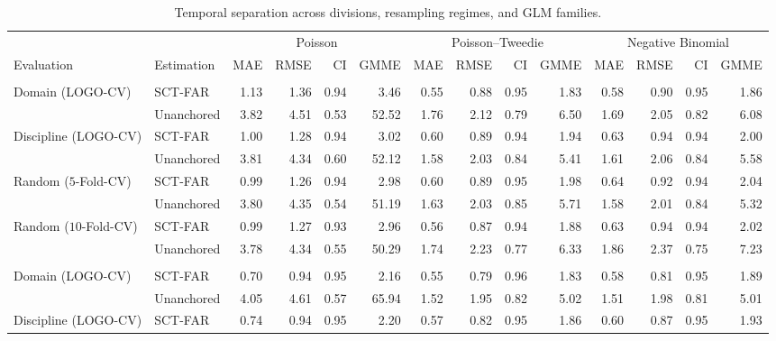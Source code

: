 \documentclass{article}
\begin{document}
\clearpage
\begin{table}[H]
\centering
\scriptsize
\captionsetup{position=top,skip=12pt}
\caption{Temporal separation across divisions, resampling regimes, and GLM families.}
\label{tab:si-temporal}
\setlength{\tabcolsep}{2pt}
\begin{tabularx}{\linewidth}{@{}>{\raggedright\arraybackslash}Xlrrrrrrrrrrrr@{}}
\toprule
 & & \multicolumn{4}{c}{Poisson} & \multicolumn{4}{c}{Poisson--Tweedie} & \multicolumn{4}{c}{Negative Binomial} \\
\cmidrule(lr){3-6}\cmidrule(lr){7-10}\cmidrule(l){11-14}
Evaluation & Estimation & MAE & RMSE & CI & GMME & MAE & RMSE & CI & GMME & MAE & RMSE & CI & GMME \\
\midrule
\multicolumn{14}{@{}l}{\textbf{Prior Window 25\%}} \\
Domain (LOGO-CV) & SCT-FAR & 1.13 & 1.36 & 0.94 & 3.46 & 0.55 & 0.88 & 0.95 & 1.83 & 0.58 & 0.90 & 0.95 & 1.86 \\
 & Unanchored & 3.82 & 4.51 & 0.53 & 52.52 & 1.76 & 2.12 & 0.79 & 6.50 & 1.69 & 2.05 & 0.82 & 6.08 \\
Discipline (LOGO-CV) & SCT-FAR & 1.00 & 1.28 & 0.94 & 3.02 & 0.60 & 0.89 & 0.94 & 1.94 & 0.63 & 0.94 & 0.94 & 2.00 \\
 & Unanchored & 3.81 & 4.34 & 0.60 & 52.12 & 1.58 & 2.03 & 0.84 & 5.41 & 1.61 & 2.06 & 0.84 & 5.58 \\
Random ($5$-Fold-CV) & SCT-FAR & 0.99 & 1.26 & 0.94 & 2.98 & 0.60 & 0.89 & 0.95 & 1.98 & 0.64 & 0.92 & 0.94 & 2.04 \\
 & Unanchored & 3.80 & 4.35 & 0.54 & 51.19 & 1.63 & 2.03 & 0.85 & 5.71 & 1.58 & 2.01 & 0.84 & 5.32 \\
Random ($10$-Fold-CV) & SCT-FAR & 0.99 & 1.27 & 0.93 & 2.96 & 0.56 & 0.87 & 0.94 & 1.88 & 0.63 & 0.94 & 0.94 & 2.02 \\
 & Unanchored & 3.78 & 4.34 & 0.55 & 50.29 & 1.74 & 2.23 & 0.77 & 6.33 & 1.86 & 2.37 & 0.75 & 7.23 \\
\addlinespace
\multicolumn{14}{@{}l}{\textbf{Prior Window 50\%}} \\
Domain (LOGO-CV) & SCT-FAR & 0.70 & 0.94 & 0.95 & 2.16 & 0.55 & 0.79 & 0.96 & 1.83 & 0.58 & 0.81 & 0.95 & 1.89 \\
 & Unanchored & 4.05 & 4.61 & 0.57 & 65.94 & 1.52 & 1.95 & 0.82 & 5.02 & 1.51 & 1.98 & 0.81 & 5.01 \\
Discipline (LOGO-CV) & SCT-FAR & 0.74 & 0.94 & 0.95 & 2.20 & 0.57 & 0.82 & 0.95 & 1.86 & 0.60 & 0.87 & 0.95 & 1.93 \\

\end{tabularx}
\end{table}
\end{document}
